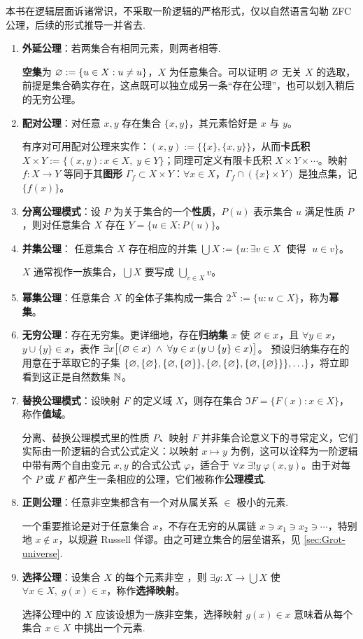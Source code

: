 本书在逻辑层面诉诸常识，不采取一阶逻辑的严格形式，仅以自然语言勾勒 ZFC 公理，后续的形式推导一并省去.
\begin{enumerate}[\bfseries {A}.1]
	\item \textbf{外延公理}：若两集合有相同元素，则两者相等.

		\textbf{空集}为 $\varnothing:=\{u \in X: u \neq u\}$，$X$ 为任意集合。可以证明 $\varnothing$ 无关 $X$ 的选取，前提是集合确实存在，这点既可以独立成另一条“存在公理”，也可以划入稍后的无穷公理。
	\item \textbf{配对公理}：对任意 $x,y$ 存在集合 $\{x,y\}$，其元素恰好是 $x$ 与 $y$。
	
		有序对可用配对公理来实作：$(x,y) := \{\{x\},\{x,y\} \}$，从而\textbf{卡氏积} $X \times Y := \{(x,y) : x \in X,\; y \in Y \}$；同理可定义有限卡氏积 $X \times Y \times \cdots$。映射 $f: X \to Y$ 等同于其\textbf{图形} $\Gamma_f \subset X \times Y$：$\forall x \in X$，$\Gamma_f \cap (\{x\} \times Y)$ 是独点集，记 $\{f(x)\}$。
	\item \textbf{分离公理模式}：设 $P$ 为关于集合的一个\textbf{性质}，$P(u)$ 表示集合 $u$ 满足性质 $P$，则对任意集合 $X$ 存在 $Y = \{u \in X : P(u) \}$。
	\item \textbf{并集公理}： 任意集合 $X$ 存在相应的并集 $\bigcup X := \{u : \exists v \in X \; \text{ 使得 }\; u \in v\}$。
	
		$X$ 通常视作一族集合，$\bigcup X$ 要写成 $\bigcup_{v \in X} v$。
	\item \textbf{幂集公理}：任意集合 $X$ 的全体子集构成一集合 $2^X := \{u : u \subset X \}$，称为\textbf{幂集}。
	\item \textbf{无穷公理}：存在无穷集。更详细地，存在\textbf{归纳集} $x$ 使 $\varnothing\in x$，且 $\forall y\in x$，$y \cup \{y\} \in x$，表作
		$\exists x \bigl[ (\varnothing \in x) \;\wedge \;\forall y \in x \left(y \cup \{y\} \in x \right)  \bigr]$。
        预设归纳集存在的用意在于萃取它的子集 $\left\{\varnothing,\{\varnothing\},\{  \varnothing,\{\varnothing\}\},\{  \varnothing,\{\varnothing\},\{  \varnothing,\{\varnothing\}\}\},\ldots \right\}$，将立即看到这正是自然数集 $\mathbb{N}$。
	\item \textbf{替换公理模式}：设映射 $F$ 的定义域 $X$，则存在集合 $\Im F = \{ F(x) : x \in X\}$，称作\textbf{值域}。
	
		分离、替换公理模式里的性质 $P$、映射 $F$ 并非集合论意义下的寻常定义，它们实际由一阶逻辑的合式公式定义：以映射 $x \mapsto y$ 为例，这可以诠释为一阶逻辑中带有两个自由变元 $x,y$ 的合式公式 $\varphi$，适合于 $\forall x\; \exists! y\; \varphi(x,y)$。由于对每个 $P$ 或 $F$ 都产生一条相应的公理，它们被称作\textbf{公理模式}.
	\item \textbf{正则公理}：任意非空集都含有一个对从属关系 $\in$ 极小的元素.
	
		一个重要推论是对于任意集合 $x$，不存在无穷的从属链 $x \ni x_1 \ni x_2 \ni \cdots$，特别地 $x \notin x$，以规避 Russell 佯谬。由之可建立集合的层垒谱系，见 \ref{sec:Grot-universe}.
	\item \textbf{选择公理}：设集合 $X$ 的每个元素非空 ，则 $\exists g: X \to \bigcup X$ 使 $\forall x \in X,\; g(x) \in x$，称作\textbf{选择映射}。

		选择公理中的 $X$ 应该设想为一族非空集，选择映射 $g(x) \in x$ 意味着从每个集合 $x \in X$ 中挑出一个元素.
\end{enumerate}

